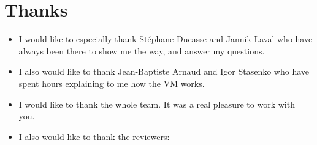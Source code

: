 \section*{Thanks}
\begin{itemize}
	\item[] \hspace{-0.5cm}I would like to especially thank St\'{e}phane Ducasse and Jannik Laval who have always been there to show me the way, and answer my questions.
	\item[] \hspace{-0.5cm}I also would like to thank Jean-Baptiste Arnaud and Igor Stasenko who have spent hours explaining to me how the VM works.
	\item[] \hspace{-0.5cm}I would like to thank the whole team. It was a real pleasure to work with you.
	\item[] \hspace{-0.5cm}I also would like to thank the reviewers: 
\end{itemize}
